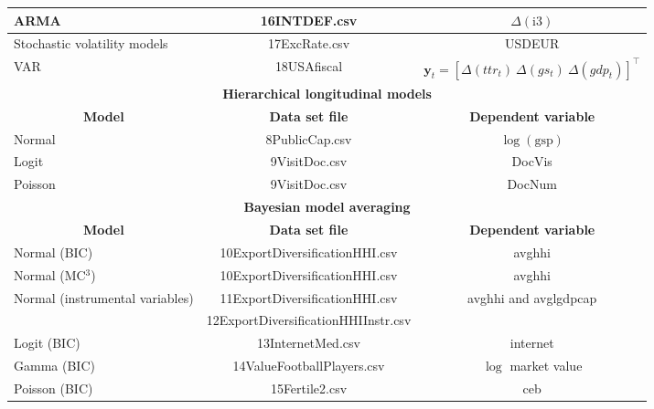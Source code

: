 \begin{table}[!ht]
\begin{tabular}{|l|c|c|}
	\hline
	ARMA & 16INTDEF.csv  & $\Delta(\text{i3})$ \\
	\hline
	Stochastic volatility models & 17ExcRate.csv  & USDEUR \\
	\hline
	VAR & 18USAfiscal  & $\bm{y}_t=[\Delta(ttr_t) \ \Delta(gs_t) \ \Delta(gdp_t)]^{\top}$ \\
	\hline
		\multicolumn{3}{|c|}{\textbf{Hierarchical longitudinal models}} \\
	\hline  
	\multicolumn{1}{|c|}{\textbf{Model}} & \multicolumn{1}{c}{\textbf{Data set file}} & \multicolumn{1}{|c|}{\textbf{Dependent variable}} \\ 
	\hline
	Normal & 8PublicCap.csv  & $\log(\text{gsp})$ \\
	\hline
	Logit & 9VisitDoc.csv  & DocVis \\
	\hline
	Poisson & 9VisitDoc.csv  & DocNum \\
	\hline
	\multicolumn{3}{|c|}{\textbf{Bayesian model averaging}} \\
	\hline  
	\multicolumn{1}{|c|}{\textbf{Model}} & \multicolumn{1}{c}{\textbf{Data set file}} & \multicolumn{1}{|c|}{\textbf{Dependent variable}} \\ 
	\hline
	Normal (BIC) & 10ExportDiversificationHHI.csv & avghhi \\
	Normal (MC$^3$) & 10ExportDiversificationHHI.csv & avghhi \\
	\multirow{2}{*}{Normal (instrumental variables)} & 11ExportDiversificationHHI.csv & \multirow{2}{*}{avghhi and avglgdpcap}\\
	& 12ExportDiversificationHHIInstr.csv & \\
	Logit (BIC) & 13InternetMed.csv & internet \\
	Gamma (BIC) & 14ValueFootballPlayers.csv & $\log$ market value\\
	Poisson (BIC) & 15Fertile2.csv & ceb \\
	\hline
  \end{tabular}
\end{table}